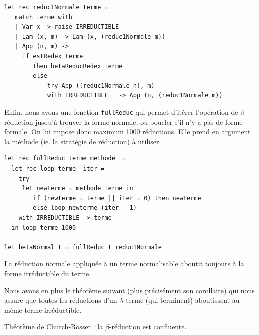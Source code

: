 \begin{Verbatim}
let rec reduc1Normale terme =
   match terme with
   | Var x -> raise IRREDUCTIBLE 
   | Lam (x, m) -> Lam (x, (reduc1Normale m))
   | App (n, m) ->
	 if estRedex terme
		then betaReducRedex terme
		else
			try App ((reduc1Normale n), m)
			with IRREDUCTIBLE   -> App (n, (reduc1Normale m)) 
\end{Verbatim}

Enfin, nous avons une fonction \texttt{fullReduc} qui permet d'itérer l'opération de
$\beta$-réduction jusqu'à trouver la forme normale, ou boucler s'il n'y a pas de forme formale.
On lui impose donc maximum 1000 réductions. 
Elle prend en argument la méthode (ie. la stratégie de réduction) à utiliser. 

\begin{Verbatim}
let rec fullReduc terme methode  =
  let rec loop terme  iter =
	try
	 let newterme = methode terme in
		if (newterme = terme || iter = 0) then newterme
		else loop newterme (iter - 1)
	with IRREDUCTIBLE -> terme	
  in loop terme 1000
	
let betaNormal t = fullReduc t reduc1Normale
\end{Verbatim}

\begin{theoreme}
La réduction normale appliquée à un terme normalisable aboutit toujours à la forme irréductible du terme.
\end{theoreme}

Nous avons en plus le théorème suivant (plus précisément son corollaire) qui nous assure que toutes les réductions d'un $\lambda$-terme (qui terminent) aboutissent au m\^{e}me
terme irréductible.



\begin{theoreme}
Théorème de Church-Rosser : la $\beta $-réduction est confluente.
\end{theoreme}

